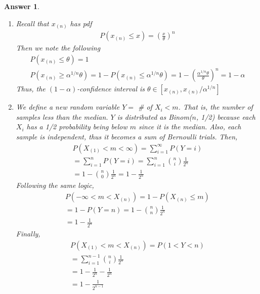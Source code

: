 \documentclass[12pt]{article}
\theoremstyle{colon}
\newtheorem*{answer}{Answer}
\begin{document}
\begin{answer}
  \leavevmode
  \begin{enumerate}[label=\arabic*)]
    \item Recall that $x_{(n)}$ has pdf
      \begin{gather*}
        P(x_{(n)} \leq x) = \left( \frac{x}{\theta} \right)^{n}
      \end{gather*}
      Then we note the following
      \begin{gather*}
        P(x_{(n)} \leq \theta) = 1 \\
        P(x_{(n)} \geq \alpha^{1/n} \theta) = 1 - P(x_{(n)} \leq \alpha^{1/n} \theta) = 1 - \left( \frac{\alpha^{1/n} \theta}{\theta} \right)^{n} = 1 - \alpha
      \end{gather*}
      Thus, the $(1-\alpha)$-confidence interval is $\theta \in [x_{(n)}, x_{(n)}/\alpha^{1/n}]$
    \item We define a new random variable $Y = $ \# of $X_{i} < m$. That is, the number of samples less than the median. $Y$ is distributed as Binom($n$, 1/2) because each $X_i$ has a 1/2 probability being below $m$ since it is the median. Also, each sample is independent, thus it becomes a sum of Bernoulli trials. Then,
      \begin{gather*}
        P(X_{(1)} < m < \infty) = \sum_{i = 1}^\infty P(Y=i) \\
        = \sum_{i = 1}^n P(Y=i) = \sum_{i = 1}^n \binom{n}{i} \frac{1}{2^n} \\
        = 1 - \binom{n}{0} \frac{1}{2^n} = 1 - \frac{1}{2^n}
      \end{gather*}
      Following the same logic,
      \begin{gather*}
        P(-\infty < m < X_{(n)}) = 1 - P(X_{(n)} \leq m) \\
        = 1 - P(Y = n) = 1 - \binom{n}{n}\frac{1}{2^n} \\
       = 1 - \frac{1}{2^n}
      \end{gather*}
      Finally,
      \begin{gather*}
        P(X_{(1)} < m < X_{(n)}) = P(1 < Y < n) \\
        = \sum_{i = 1}^{n-1} \binom{n}{i} \frac{1}{2^n} \\
       = 1 - \frac{1}{2^n} - \frac{1}{2^n} \\
       = 1 - \frac{1}{2^{n-1}}
      \end{gather*}
  \end{enumerate}
\end{answer}
\end{document}
